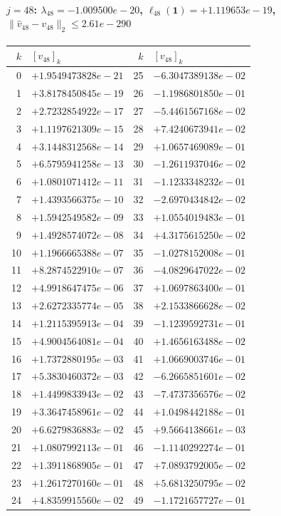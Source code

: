 \paragraph{$j = 48$: $\lambda_{48} = -1.009500e-20$, \quad $\ell_{48}(\mathbf{1}) = +1.119653e-19$, \quad $\|\hat{v}_{48} - v_{48}\|_2 \leq 2.61e-290$}
\begin{center}
{\footnotesize
\begin{tabular}{r@{\;\;}l@{\quad}r@{\;\;}l}
\toprule
$k$ & $[v_{48}]_k$ & $k$ & $[v_{48}]_k$ \\
\midrule
0 & $+1.9549473828e-21$ & 25 & $-6.3047389138e-02$ \\
1 & $+3.8178450845e-19$ & 26 & $-1.1986801850e-01$ \\
2 & $+2.7232854922e-17$ & 27 & $-5.4461567168e-02$ \\
3 & $+1.1197621309e-15$ & 28 & $+7.4240673941e-02$ \\
4 & $+3.1448312568e-14$ & 29 & $+1.0657469089e-01$ \\
5 & $+6.5795941258e-13$ & 30 & $-1.2611937046e-02$ \\
6 & $+1.0801071412e-11$ & 31 & $-1.1233348232e-01$ \\
7 & $+1.4393566375e-10$ & 32 & $-2.6970434842e-02$ \\
8 & $+1.5942549582e-09$ & 33 & $+1.0554019483e-01$ \\
9 & $+1.4928574072e-08$ & 34 & $+4.3175615250e-02$ \\
10 & $+1.1966665388e-07$ & 35 & $-1.0278152008e-01$ \\
11 & $+8.2874522910e-07$ & 36 & $-4.0829647022e-02$ \\
12 & $+4.9918647475e-06$ & 37 & $+1.0697863400e-01$ \\
13 & $+2.6272335774e-05$ & 38 & $+2.1533866628e-02$ \\
14 & $+1.2115395913e-04$ & 39 & $-1.1239592731e-01$ \\
15 & $+4.9004564081e-04$ & 40 & $+1.4656163488e-02$ \\
16 & $+1.7372880195e-03$ & 41 & $+1.0669003746e-01$ \\
17 & $+5.3830460372e-03$ & 42 & $-6.2665851601e-02$ \\
18 & $+1.4499833943e-02$ & 43 & $-7.4737356576e-02$ \\
19 & $+3.3647458961e-02$ & 44 & $+1.0498442188e-01$ \\
20 & $+6.6279836883e-02$ & 45 & $+9.5664138661e-03$ \\
21 & $+1.0807992113e-01$ & 46 & $-1.1140292274e-01$ \\
22 & $+1.3911868905e-01$ & 47 & $+7.0893792005e-02$ \\
23 & $+1.2617270160e-01$ & 48 & $+5.6813250795e-02$ \\
24 & $+4.8359915560e-02$ & 49 & $-1.1721657727e-01$ \\
\bottomrule
\end{tabular}
}
\end{center}

